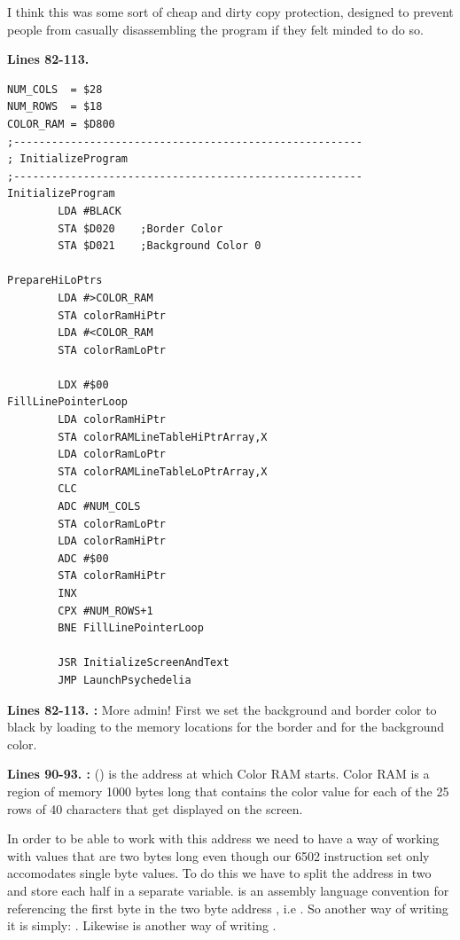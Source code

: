 I think this was some sort of cheap and dirty copy protection, designed to prevent people from casually disassembling the
program if they felt minded to do so. 

\clearpage
\textbf{Lines 82-113. }
\begin{lstlisting}[caption=The initialization routine - visited only once\, at the very start of execution]
NUM_COLS  = $28
NUM_ROWS  = $18
COLOR_RAM = $D800
;-------------------------------------------------------
; InitializeProgram
;-------------------------------------------------------
InitializeProgram   
        LDA #BLACK
        STA $D020    ;Border Color
        STA $D021    ;Background Color 0

PrepareHiLoPtrs
        LDA #>COLOR_RAM
        STA colorRamHiPtr
        LDA #<COLOR_RAM
        STA colorRamLoPtr

        LDX #$00
FillLinePointerLoop
        LDA colorRamHiPtr
        STA colorRAMLineTableHiPtrArray,X
        LDA colorRamLoPtr
        STA colorRAMLineTableLoPtrArray,X
        CLC 
        ADC #NUM_COLS
        STA colorRamLoPtr
        LDA colorRamHiPtr
        ADC #$00
        STA colorRamHiPtr
        INX 
        CPX #NUM_ROWS+1
        BNE FillLinePointerLoop

        JSR InitializeScreenAndText
        JMP LaunchPsychedelia

\end{lstlisting}
\clearpage

\textbf{Lines 82-113. :} More admin!  First we set the background and border color to black by loading
 to the memory locations  for the border and  for the background color.

\bigskip
\bigskip
\textbf{Lines 90-93. :}  () is the address at which Color RAM starts. Color
RAM is a region of memory 1000 bytes long that contains the color value for each of the 25 rows of 40 characters that get displayed on the
screen. 

In order to be able to work with this address we need to have a way of working with values that are two bytes long even though
our 6502 instruction set only accomodates single byte values. To do this we have to split the address in two and store each half in 
a separate variable.  is an assembly language convention for referencing the first byte in the two byte address
, i.e . So another way of writing it is simply: . Likewise  is
another way of writing . 


